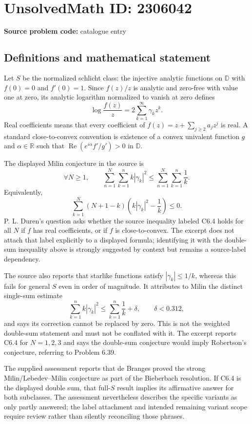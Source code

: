 \documentclass[11pt]{article}
\newcommand{\R}{\mathbb{R}}
\begin{document}
\section*{UnsolvedMath ID: 2306042}
\textbf{Source problem code:} catalogue entry
\subsection{Definitions and mathematical statement}
Let $S$ be the normalized schlicht class: the injective analytic functions on $\mathbb D$ with $f(0)=0$ and $f'(0)=1$. Since $f(z)/z$ is analytic and zero-free with value one at zero, its analytic logarithm normalized to vanish at zero defines
\[
 \log\frac{f(z)}z=2\sum_{k=1}^\infty\gamma_k z^k.
\]
Real coefficients means that every coefficient of $f(z)=z+\sum_{j\geq2}a_jz^j$ is real. A standard close-to-convex convention is existence of a convex univalent function $g$ and $\alpha\in\R$ such that $\operatorname{Re}(e^{i\alpha}f'/g')>0$ in $\mathbb D$.

The displayed Milin conjecture in the source is
\[
 \forall N\geq1,\qquad
 \sum_{n=1}^{N}\sum_{k=1}^{n} k|\gamma_k|^2
 \leq\sum_{n=1}^{N}\sum_{k=1}^{n}\frac1k.
\]
Equivalently,
\[
 \sum_{k=1}^{N}(N+1-k)\left(k|\gamma_k|^2-\frac1k\right)\leq0.
\]
P. L. Duren's question asks whether the source inequality labeled C6.4 holds for all $N$ if $f$ has real coefficients, or if $f$ is close-to-convex. The excerpt does not attach that label explicitly to a displayed formula; identifying it with the double-sum inequality above is strongly suggested by context but remains a source-label dependency.

The source also reports that starlike functions satisfy $|\gamma_k|\leq1/k$, whereas this fails for general $S$ even in order of magnitude. It attributes to Milin the distinct single-sum estimate
\[
 \sum_{k=1}^{n}k|\gamma_k|^2\leq\sum_{k=1}^{n}\frac1k+\delta,
 \qquad\delta<0.312,
\]
and says its correction cannot be replaced by zero. This is not the weighted double-sum statement and must not be conflated with it. The excerpt reports C6.4 for $N=1,2,3$ and says the double-sum conjecture would imply Robertson's conjecture, referring to Problem 6.39.

The supplied assessment reports that de Branges proved the strong Milin/Lebedev--Milin conjecture as part of the Bieberbach resolution. If C6.4 is the displayed double sum, that full-$S$ result implies its affirmative answer for both subclasses. The assessment nevertheless describes the specific variants as only partly answered; the label attachment and intended remaining variant scope require review rather than silently reconciling those phrases.
\end{document}
